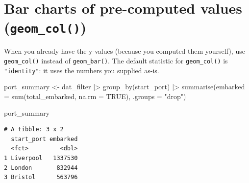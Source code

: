 \documentclass[
  english,
  letterpaper,
]{book}
\newenvironment{Shaded}{\begin{snugshade}}{\end{snugshade}}
\newcommand{\AttributeTok}[1]{\textcolor[rgb]{0.40,0.45,0.13}{#1}}
\newcommand{\ConstantTok}[1]{\textcolor[rgb]{0.56,0.35,0.01}{#1}}
\newcommand{\FunctionTok}[1]{\textcolor[rgb]{0.28,0.35,0.67}{#1}}
\newcommand{\NormalTok}[1]{\textcolor[rgb]{0.00,0.23,0.31}{#1}}
\newcommand{\OtherTok}[1]{\textcolor[rgb]{0.00,0.23,0.31}{#1}}
\newcommand{\SpecialCharTok}[1]{\textcolor[rgb]{0.37,0.37,0.37}{#1}}
\newcommand{\StringTok}[1]{\textcolor[rgb]{0.13,0.47,0.30}{#1}}
\begin{document}
\section{\texorpdfstring{Bar charts of pre-computed values
(\texttt{geom\_col()})}{Bar charts of pre-computed values (geom\_col())}}\label{bar-charts-of-pre-computed-values-geom_col}

When you already have the y-values (because you computed them yourself),
use \texttt{geom\_col()} instead of \texttt{geom\_bar()}. The default
statistic for \texttt{geom\_col()} is \texttt{"identity"}: it uses the
numbers you supplied as-is.

\begin{Shaded}
\begin{Highlighting}[]
\NormalTok{port\_summary }\OtherTok{\textless{}{-}}\NormalTok{ dat\_filter }\SpecialCharTok{|\textgreater{}}
  \FunctionTok{group\_by}\NormalTok{(start\_port) }\SpecialCharTok{|\textgreater{}}
  \FunctionTok{summarise}\NormalTok{(}\AttributeTok{embarked =} \FunctionTok{sum}\NormalTok{(total\_embarked, }\AttributeTok{na.rm =} \ConstantTok{TRUE}\NormalTok{),}
            \AttributeTok{.groups =} \StringTok{"drop"}\NormalTok{)}

\NormalTok{port\_summary}
\end{Highlighting}
\end{Shaded}

\begin{verbatim}
# A tibble: 3 x 2
  start_port embarked
  <fct>         <dbl>
1 Liverpool   1337530
2 London       832944
3 Bristol      563796
\end{verbatim}
\end{document}
